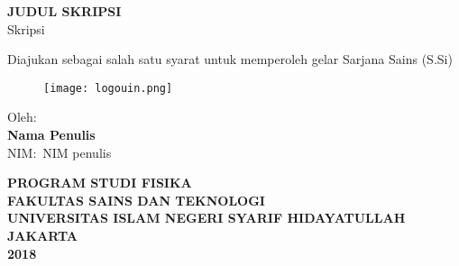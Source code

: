 \begin{center}
    {\textbf{\Large JUDUL SKRIPSI}}\\
    \vspace{2cm}
    {\large Skripsi}

    Diajukan sebagai salah satu syarat untuk memperoleh gelar Sarjana Sains (S.Si)

    \begin{figure}[H]
        \centering
        \vspace{1cm}
        \texttt{[image: logouin.png]}\label{fig:logouin}\\
        \vspace{2cm}
    \end{figure}

    Oleh:\\
    \textbf{Nama Penulis}\\
    NIM:\ NIM penulis\\
    \vfill

    {%
    \bfseries 
        PROGRAM STUDI FISIKA\\
        FAKULTAS SAINS DAN TEKNOLOGI\\
        UNIVERSITAS ISLAM NEGERI SYARIF HIDAYATULLAH\\
        JAKARTA\\
        2018\\
    }
\end{center}
